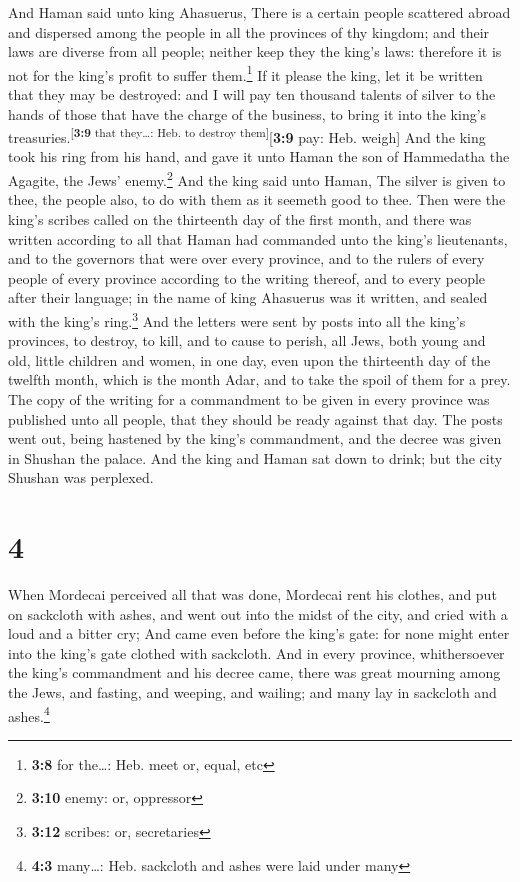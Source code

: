  And Haman said unto king Ahasuerus, There is a certain
people scattered abroad and dispersed among the people in all the
provinces of thy kingdom; and their laws are diverse from all people;
neither keep they the king's laws: therefore it is not for the king's
profit to suffer them.\footnote{\textbf{3:8} for the\ldots: Heb. meet
  or, equal, etc}  If it please the king, let it be
written that they may be destroyed: and I will pay ten thousand talents
of silver to the hands of those that have the charge of the business, to
bring it into the king's treasuries.\textsuperscript{{[}\textbf{3:9}
that they\ldots: Heb. to destroy them{]}}{[}\textbf{3:9} pay: Heb.
weigh{]}  And the king took his ring from his hand, and
gave it unto Haman the son of Hammedatha the Agagite, the Jews'
enemy.\footnote{\textbf{3:10} enemy: or, oppressor}  And
the king said unto Haman, The silver is given to thee, the people also,
to do with them as it seemeth good to thee.  Then were
the king's scribes called on the thirteenth day of the first month, and
there was written according to all that Haman had commanded unto the
king's lieutenants, and to the governors that were over every province,
and to the rulers of every people of every province according to the
writing thereof, and to every people after their language; in the name
of king Ahasuerus was it written, and sealed with the king's
ring.\footnote{\textbf{3:12} scribes: or, secretaries} 
And the letters were sent by posts into all the king's provinces, to
destroy, to kill, and to cause to perish, all Jews, both young and old,
little children and women, in one day, even upon the thirteenth day of
the twelfth month, which is the month Adar, and to take the spoil of
them for a prey.  The copy of the writing for a
commandment to be given in every province was published unto all people,
that they should be ready against that day.  The posts
went out, being hastened by the king's commandment, and the decree was
given in Shushan the palace. And the king and Haman sat down to drink;
but the city Shushan was perplexed.

\hypertarget{section-3}{%
\section{4}\label{section-3}}

 When Mordecai perceived all that was done, Mordecai rent
his clothes, and put on sackcloth with ashes, and went out into the
midst of the city, and cried with a loud and a bitter cry;
 And came even before the king's gate: for none might
enter into the king's gate clothed with sackcloth.  And in
every province, whithersoever the king's commandment and his decree
came, there was great mourning among the Jews, and fasting, and weeping,
and wailing; and many lay in sackcloth and ashes.\footnote{\textbf{4:3}
  many\ldots: Heb. sackcloth and ashes were laid under many}

